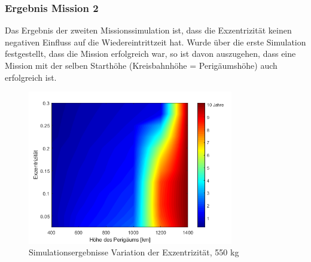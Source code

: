 \subsubsection{Ergebnis Mission 2}
Das Ergebnis der zweiten Missionssimulation ist, dass die Exzentrizität keinen negativen Einfluss auf die Wiedereintrittzeit hat. Wurde über die erste Simulation festgestellt, dass die Mission erfolgreich war, so ist davon auszugehen, dass eine Mission mit der selben Starthöhe (Kreisbahnhöhe = Perigäumshöhe) auch erfolgreich ist.

\begin{figure}[h]
	\centering
		\includegraphics[width=0.80\textwidth]{./graphics/GMAT/ecc_perigee_550kg.png}
		\caption{Simulationsergebnisse Variation der Exzentrizität, 550 kg}
	\label{fig:GMAT_ecc_c}
\end{figure}


